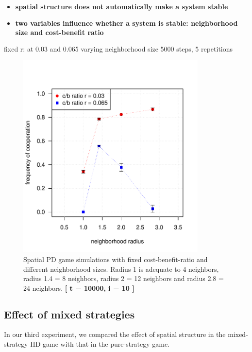 \begin{itemize}
\item{\textbf{spatial structure does not automatically make a system stable}}\\
\item{\textbf{two variables influence whether a system is stable: neighborhood size and cost-benefit ratio}}
\end{itemize}



fixed r: at 0.03 and 0.065
varying neighborhood size
5000 steps, 5 repetitions

\begin{figure}[H]
	\centering 
	\includegraphics[width=9.5cm]{task2_radiusplot}
	\caption{Spatial PD game simulations with fixed cost-benefit-ratio and different neighborhood sizes. Radius 1 is adequate to 4 neighbors, radius 1.4 = 8 neighbors, radius 2 = 12 neighbors and radius 2.8 = 24 neighbors.  \textbf{[ t = 10000, i = 10 ]} }\label{fig: task2_radiusplot}
\end{figure}


\subsection{Effect of mixed strategies}

In our third experiment, we compared the effect of spatial structure in the mixed-strategy HD game with that in the pure-strategy game.


